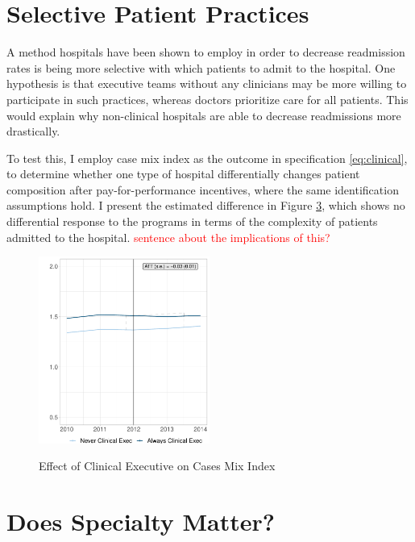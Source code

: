 \documentclass[12pt]{article}
\begin{document}
\begin{figure}
\begin{subfigure}[b]{0.45\textwidth}
         \label{fig:mort_synth_clinical}
     \end{subfigure}
        \label{fig:clinicalsynthdid}
    \end{figure}

    \section{Selective Patient Practices}

    A method hospitals have been shown to employ in order to decrease readmission rates is being more selective with which patients to admit to the hospital. One hypothesis is that executive teams without any clinicians may be more willing to participate in such practices, whereas doctors prioritize care for all patients. This would explain why non-clinical hospitals are able to decrease readmissions more drastically. 

    To test this, I employ case mix index as the outcome in specification \ref{eq:clinical}, to determine whether one type of hospital differentially changes patient composition after pay-for-performance incentives, where the same identification assumptions hold. I present the estimated difference in Figure \ref{fig:main_cmi_clinical}, which shows no differential response to the programs in terms of the complexity of patients admitted to the hospital. \textcolor{red}{sentence about the implications of this?}

    \begin{figure}[ht!]
        \centering
        \caption{Effect of Clinical Executive on Cases Mix Index}
        \includegraphics[width=0.5\textwidth]{Objects/cmi_md_nomd_synth_graph.pdf}
        \label{fig:main_cmi_clinical}
    \end{figure}

    \section{Does Specialty Matter?}
\end{document}
